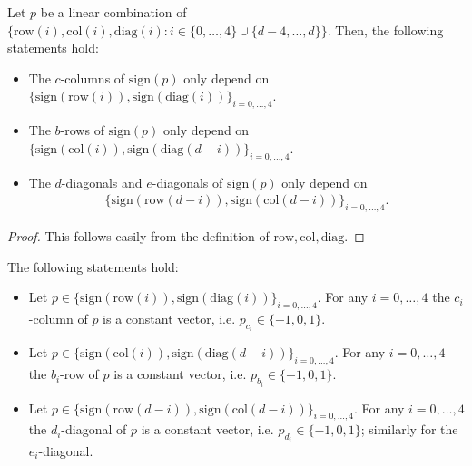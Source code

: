 \begin{proposition}
    Let $p$ be a linear combination of $\{ \mathrm{row}(i), \mathrm{col}(i), \mathrm{diag}(i) : i \in \{ 0, \dots, 4\} \cup \{ d-4, \dots, d \} \}$. Then, the following statements hold:
  \begin{itemize}
  \item The $c$-columns of $\mathrm{sign}(p)$ only depend on $\{ \mathrm{sign}(\mathrm{row}(i)), \mathrm{sign}(\mathrm{diag}(i)) \}_{i = 0, \dots, 4}$.
  \item The $b$-rows of $\mathrm{sign}(p)$ only depend on $\{ \mathrm{sign}(\mathrm{col}(i)), \mathrm{sign}(\mathrm{diag}(d-i)) \}_{i = 0, \dots, 4}$.
  \item The $d$-diagonals and $e$-diagonals of $\mathrm{sign}(p)$ only depend on 
  \begin{align*}
    \{ \mathrm{sign}(\mathrm{row}(d-i)), \mathrm{sign}(\mathrm{col}(d-i)) \}_{i = 0, \dots, 4}.
  \end{align*}
  \end{itemize}
  \end{proposition}
  
  \begin{proof}
   This follows easily from the definition of $\mathrm{row}, \mathrm{col}, \mathrm{diag}$.
  \end{proof}

  \begin{proposition}
    The following statements hold:
    \begin{itemize}
    \item Let $p \in \{\mathrm{sign}(\mathrm{row}(i)), \mathrm{sign}(\mathrm{diag}(i)) \}_{i = 0, \dots, 4}$. For any $i = 0, \dots, 4$ the $c_{i}$-column of $p$ is a constant vector, i.e. $p_{c_{i}} \in \{ -1, 0, 1 \}$. 
  
    \item Let $p \in \{\mathrm{sign}( \mathrm{col}(i)),\mathrm{sign}(\mathrm{diag}(d-i)) \}_{i = 0, \dots, 4}$. For any $i = 0, \dots, 4$ the $b_{i}$-row of $p$ is a constant vector, i.e. $p_{b_{i}} \in \{ -1, 0, 1 \}$. 
  
    \item Let $p \in \{ \mathrm{sign}(\mathrm{row}(d-i)), \mathrm{sign}(\mathrm{col}(d-i)) \}_{i = 0, \dots, 4}$. For any $i = 0, \dots, 4$ the $d_{i}$-diagonal of $p$ is a constant vector, i.e. $p_{d_{i}} \in \{ -1, 0, 1 \}$; similarly for the $e_{i}$-diagonal. 
    \end{itemize}
  \end{proposition}
  
